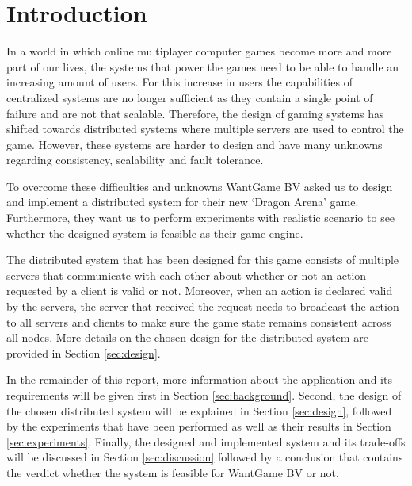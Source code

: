 \section{Introduction}
In a world in which online multiplayer computer games become more and more part of our lives, the systems that power the games need to be able to handle an increasing amount of users.
For this increase in users the capabilities of centralized systems are no longer sufficient as they contain a single point of failure and are not that scalable.
Therefore, the design of gaming systems has shifted towards distributed systems where multiple servers are used to control the game.
However, these systems are harder to design and have many unknowns regarding consistency, scalability and fault tolerance.

To overcome these difficulties and unknowns WantGame BV asked us to design and implement a distributed system for their new `Dragon Arena' game.
Furthermore, they want us to perform experiments with realistic scenario to see whether the designed system is feasible as their game engine.

The distributed system that has been designed for this game consists of multiple servers that communicate with each other about whether or not an action requested by a client is valid or not. 
Moreover, when an action is declared valid by the servers, the server that received the request needs to broadcast the action to all servers and clients to make sure the game state remains consistent across all nodes.
More details on the chosen design for the distributed system are provided in Section \ref{sec:design}.

In the remainder of this report, more information about the application and its requirements will be given first in Section \ref{sec:background}. 
Second, the design of the chosen distributed system will be explained in Section \ref{sec:design}, followed by the experiments that have been performed as well as their results in Section \ref{sec:experiments}.
Finally, the designed and implemented system and its trade-offs will be discussed in Section \ref{sec:discussion} followed by a conclusion that contains the verdict whether the system is feasible for WantGame BV or not.